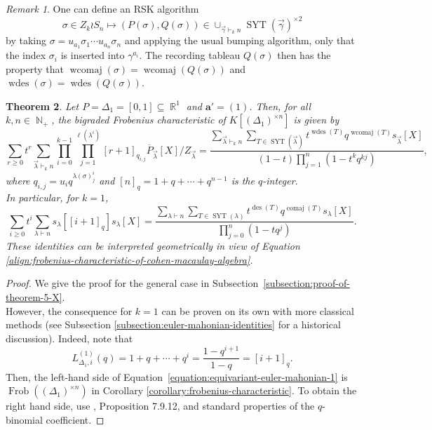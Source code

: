 \documentclass[a4paper,12pt]{amsart}
\theoremstyle{plain}
\newtheorem{theorem}{Theorem}[section]
\theoremstyle{definition}
\theoremstyle{remark}
\newtheorem{remark}[theorem]{Remark}
\DeclareMathOperator{\NN}{\mathbb{N}}
\DeclareMathOperator{\RR}{\mathbb{R}}
\DeclareMathOperator{\comaj}{comaj}
\DeclareMathOperator{\des}{des}
\DeclareMathOperator{\Frob}{Frob}
\DeclareMathOperator{\SYT}{SYT}
\DeclareMathOperator{\wcomaj}{wcomaj}
\DeclareMathOperator{\wdes}{wdes}
\begin{document}
\begin{remark}
    One can define an RSK algorithm
    \[
    \sigma \in Z_k \wr S_n \mapsto 
    (P(\sigma),Q(\sigma))\in \cup_{\vec{\gamma}\vdash_k n} \SYT(\vec{\gamma})^{\times 2}
    \]
    by taking $\sigma = u_{a_1} \sigma_1 \cdots u_{a_n} \sigma_n$ and applying the usual bumping algorithm, only that the index $\sigma_i$ is inserted into $\gamma^{a_i}$. The recording tableau $Q(\sigma)$ then has the property that $\wcomaj(\sigma) = \wcomaj(Q(\sigma))$ and $\wdes(\sigma) = \wdes(Q(\sigma)).$
\end{remark}

\begin{theorem}\label{theorem:equivariant-euler-mahonian}
    Let $P = \Delta_1 = [0, 1] \subseteq \RR^1$ and $\bm{a}' = (1)$. Then, for all $k, n \in \NN_+$, the bigraded Frobenius characteristic of $K[(\Delta_1)^{\times n}]$ is given by
\begin{equation}\label{equation:equivariant-euler-mahonian-3}
   \sum_{r \geq 0} t^r  \sum_{\vec{\lambda} \vdash_k n} \prod_{i=0}^{k-1} \prod_{j = 1}^{\ell(\lambda^i)} [r + 1]_{q_{i, j}} \overline{P}_{\vec{\lambda}}[X]/Z_{\vec{\lambda}} = \frac{\sum_{\vec{\lambda} \vdash_k n}\sum_{T \in \SYT(\vec{\lambda})} t^{{\wdes}(T)} q^{{\wcomaj}(T)} s_{\vec{\lambda}}[X]}{(1 - t)\prod_{j = 1}^n (1 - t^kq^{kj})},
\end{equation}
where $q_{i, j} = u_i q^{\lambda(\sigma)_j^i}$ and $[n]_q = 1 + q + \cdots + q^{n - 1}$ is the $q$-integer. \\
        
In particular, for $k=1$, 
\begin{equation}\label{equation:equivariant-euler-mahonian-1}
            \sum_{i \geq 0} t^i \sum_{\lambda \vdash n} s_\lambda \left [ [i + 1]_q \right ] s_\lambda[X] = \frac{\sum_{\lambda \vdash n} \sum_{T \in \SYT(\lambda)} t^{\des(T)} q^{\comaj(T)} s_\lambda[X]}{\prod_{j = 0}^n (1 - tq^j)}.
        \end{equation}
These identities can be interpreted geometrically in view of Equation \ref{align:frobenius-characteristic-of-cohen-macaulay-algebra}.
\end{theorem}

\begin{proof}
We give the proof for the general case in Subsection~\ref{subsection:proof-of-theorem-5-X}. \\

However, the consequence for $k=1$ can be proven on its own with more classical methods (see Subsection \ref{subsection:euler-mahonian-identities} for a historical discussion). Indeed, note that
\[
L_{\Delta_1, i}^{(1)}(q) = 1+ q + \cdots + q^i = \frac{1 - q^{i + 1}}{1 - q} = [i + 1]_q.
\]
Then, the left-hand side of Equation~\eqref{equation:equivariant-euler-mahonian-1}
is $\Frob ((\Delta_1)^{\times n})$ in Corollary \ref{corollary:frobenius-characteristic}. To obtain the right hand side, use \cite{stanley-enumerative-2}, Proposition 7.9.12, and standard properties of the $q$-binomial coefficient. 
\end{proof}
\end{document}
